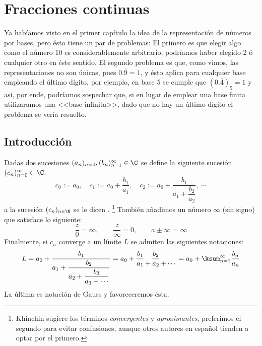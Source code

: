 \documentclass[teoria-numeros.tex]{subfiles}
\begin{document}
\chapter{Fracciones continuas}
Ya habíamos visto en el primer capítulo la idea de la representación de números por bases, pero ésto tiene un par de problemas:
El primero es que elegir algo como el número 10 es considerablemente arbitrario, podríamos haber elegido 2 ó cualquier otro en éste sentido.
El segundo problema es que, como vimos, las representaciones no son únicas, pues $0.\overline{9} = 1$, y ésto aplica para cualquier base empleando el último
dígito, por ejemplo, en base 5 se cumple que $( 0.\overline{4} )_5 = 1$ y así, por ende, podríamos sospechar que, si en lugar de emplear una base finita
utilizaramos una <<base infinita>>, dado que no hay un último dígito el problema se vería resuelto.

\section{Introducción}
\nocite{khinchin:fractions}
\begin{mydefi}
	Dadas dos sucesiones $(a_n)_{n=0}, \break (b_n)_{n = 1}^\infty \in \C$ se define la siguiente sucesión $(c_n)_{n=0}^\infty \in \C$:
	$$ c_0 := a_0, \quad c_1 := a_0 + \dfrac{b_1}{a_1}, \quad c_2 := a_0 + \dfrac{b_1}{a_1 + \dfrac{b_2}{a_2}}, \; \cdots $$
	a la sucesión $(c_n)_{n\in\N}$ se le dicen .%
	\footnote{Khinchin sugiere los términos \textit{convergentes} y \textit{aproximantes}, preferimos el segundo para evitar confusiones,
	aunque otros autores en español tienden a optar por el primero.} 
	También añadimos un número $\infty$ (sin signo) que satisface lo siguiente:
	$$ \frac{z}{0} = \infty, \qquad \frac{z}{\infty} = 0, \qquad a \pm \infty = \infty $$
	Finalmente, si $c_n$ converge a un límite $L$ se admiten las siguientes notaciones:
	$$ L = a_0 + \dfrac{b_1}{a_1 + \dfrac{b_2}{a_2 + \dfrac{b_3}{a_3 + \cdots}}} = a_0 + \frac{b_1}{a_1} {{}\atop +} \frac{b_2}{a_2} {{}\atop + \cdots}
	= a_0 + \ksum_{n=1}^\infty \frac{b_n}{a_n} $$
	La última es notación de Gauss y favoreceremos ésta.
\end{mydefi}
\end{document}
